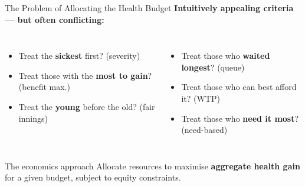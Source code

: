 \documentclass[aspectratio=169, 12pt]{beamer}
\begin{document}
\begin{frame}{The Problem of Allocating the Health Budget}
  \small
  \textbf{Intuitively appealing criteria — but often conflicting:}
  \begin{columns}
      \begin{itemize}
        \item Treat the \textbf{sickest} first? (severity)
        \item Treat those with the \textbf{most to gain}? (benefit max.)
        \item Treat the \textbf{young} before the old? (fair innings)
      \end{itemize}
      \begin{itemize}
        \item Treat those who \textbf{waited longest}? (queue)
        \item Treat those who can best afford it? (WTP)
        \item Treat those who \textbf{need it most}? (need-based)
      \end{itemize}
  \end{columns}
  \vspace{0.3em}
  \begin{alertblock}{The economics approach}
    Allocate resources to maximise \textbf{aggregate health gain} for a given budget, subject to equity constraints.
  \end{alertblock}
\end{frame}
\end{document}
